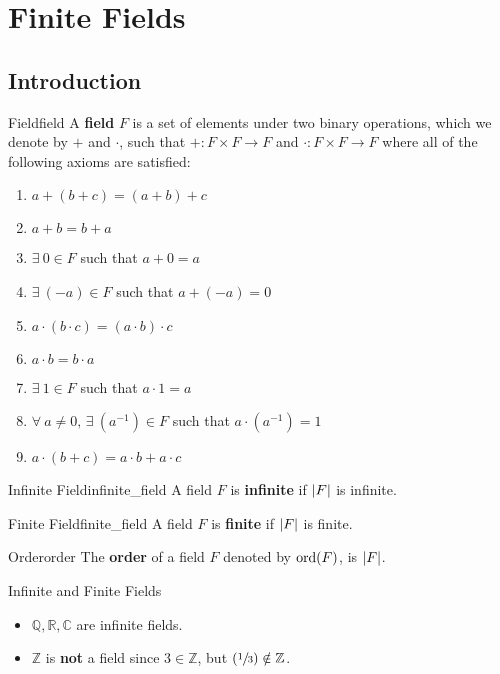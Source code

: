\chapter{Finite Fields}

\section{Introduction}
\begin{Definition}{Field}{field}
    A \textbf{field} $ F $ is a set of elements under two binary operations,
    which we denote by $ + $ and $ \cdot $, such that
    $ {+\colon F\times F\to F} $ and $ {\cdot\colon F\times F\to F} $
    where all of the following axioms are satisfied:
    \begin{enumerate}[label=V\arabic*]
        \item $ a+(b+c)=(a+b)+c $
        \item $ a+b=b+a $
        \item $ \exists\ 0\in F $ such that $ a+0=a $
        \item $ \exists\ (-a)\in F $ such that $ a+(-a)=0 $
        \item $ a\cdot (b\cdot c)=(a\cdot b)\cdot c $
        \item $ a\cdot b=b\cdot a $
        \item $ \exists\ 1\in F $ such that $ a\cdot 1=a $
        \item $ \forall\ a\neq 0,\,\exists\ (a^{-1})\in F $ such that
              $ a\cdot (a^{-1})=1 $
        \item $ a\cdot (b+c)=a\cdot b+a\cdot c $
    \end{enumerate}
\end{Definition}

\begin{Definition}{Infinite Field}{infinite_field}
    A field $ F $ is \textbf{infinite} if $ \lvert F\rvert $ is infinite.
\end{Definition}

\begin{Definition}{Finite Field}{finite_field}
    A field $ F $ is \textbf{finite} if $ \lvert F\rvert $ is finite.
\end{Definition}

\begin{Definition}{Order}{order}
    The \textbf{order} of a field $ F $ denoted by $ \operatorname{ord}(F) $, is $ \lvert F\rvert $.
\end{Definition}

\begin{Example}{Infinite and Finite Fields}{}
    \begin{itemize}
        \item $ \mathbb{Q},\mathbb{R},\mathbb{C} $ are infinite fields.
        \item $ \mathbb{Z} $ is \textbf{not} a field since $ 3\in\mathbb{Z} $, but
              $ (\sfrac{1}{3})\notin\mathbb{Z} $.
    \end{itemize}
\end{Example}

